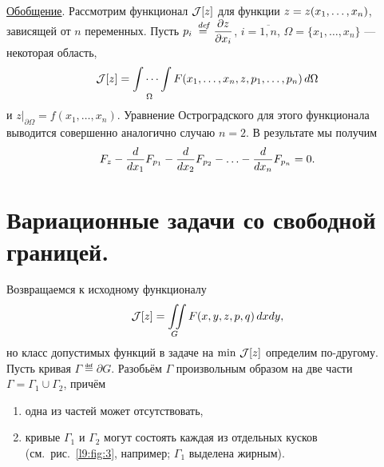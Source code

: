 \noindent\underline{Обобщение}. Рассмотрим функционал $\mathcal{J}[z]$ для функции $z\?=z(x_1,\ldots,x_n)$, зависящей от $n$ переменных. Пусть $\displaystyle p_i\stackrel{\hspace{0.09 cm}de\!f}{=}\frac{\partial z}{\partial x_i}$, $i=\overline{1,n}$, $\Omega=\{x_1,\ldots,x_n\}$ --- некоторая область,
\begin{equation*}
	\mathcal{J}[z]=\idotsint\limits_{\Omega}F(x_1,\ldots,x_n,z,p_1,\ldots,p_n)\,d\Omega
\end{equation*}
и $z\Big|_{\partial\Omega}=f(x_1,\ldots,x_n)$. Уравнение Остроградского для этого функционала выводится совершенно аналогично случаю $n=2$. В результате мы получим 
\begin{equation*}
	 F_z-\frac{d}{dx_1}F_{p_1}-\frac{d}{dx_2}F_{p_2}-\ldots-\frac{d}{dx_n}F_{p_n}=0.
\end{equation*}
\section{Вариационные задачи со свободной границей.}
\label{lecture9section3}
Возвращаемся к исходному функционалу
\begin{equation*}
	\mathcal{J}[z]=\iint\limits_{G}F(x,y,z,p,q)\,dxdy,
\end{equation*}
но класс допустимых функций в задаче на $\min\,\mathcal{J}[z]$ определим по-другому. Пусть кривая $\Gamma\eqdef\partial G$. Разобьём $\Gamma$ произвольным образом на две части $\Gamma=\Gamma_1\cup \Gamma_2$, причём 
\begin{enumerate}
	\item одна из частей может отсутствовать,
	\item кривые $\Gamma_1$ и $\Gamma_2$ могут состоять каждая из отдельных кусков (см.~рис.~\ref{l9:fig:3}, например; $\Gamma_1$ выделена жирным).
\end{enumerate} 
